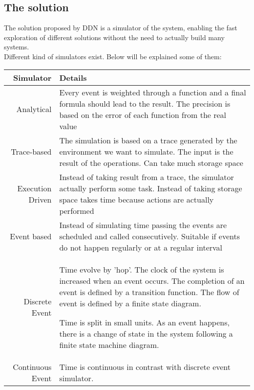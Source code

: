 \subsection{The solution}
The solution proposed by DDN is a simulator of the system, enabling the fast
exploration of different solutions without the need to actually build many
systems. \\
Different kind of simulators exist. Below will be explained some of them:

\vspace{0.5cm}
\begin{tabular}{r | p{}}
    \textbf{Simulator} & \textbf{Details} \\ \hline
    Analytical & 
    Every event is weighted through a function and a final formula
    should lead to the result. The precision is based on the error of each
    function from the real value \\ \hline

    Trace-based &
    The simulation is based on a trace generated by the environment we
    want to simulate. The input is the result of the operations. Can take much
    storage space\\\hline

    Execution Driven &
    Instead of taking result from a trace, the simulator
    actually perform some task. Instead of taking storage space takes time
    because actions are actually performed\\\hline

    Event based & 
    Instead of simulating time passing the events are scheduled
    and called consecutively. Suitable if events do not happen regularly or at a
    regular interval\\\hline
    
    Discrete Event & 
    Time evolve by 'hop'. The clock of the system is increased when an event
    occurs. The completion of an event is defined by a transition function. The
    flow of event is defined by a finite state diagram.

    Time is split in small units. As an event happens, there is
    a change of state in the system following a finite state machine
    diagram.\\\hline

    Continuous Event & 
    Time is continuous in contrast with discrete event simulator.
\end{tabular}
\vspace{0.5cm}

